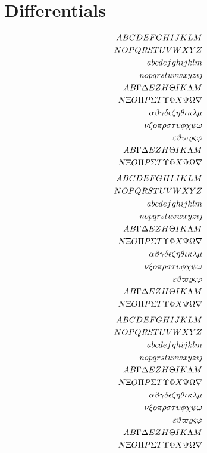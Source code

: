 \documentclass[fleqn]{article}
\def\test#1{#1}
\def\testupperi{%
  \test A \test B \test C \test D \test E \test F \test G \test H
  \test I \test J \test K \test L \test M }
\def\testupperii{%
  \test N \test O \test P \test Q \test R \test S \test T \test U
  \test V \test W \test X \test Y \test Z }
\def\testloweri{%
  \test a \test b \test c \test d \test e \test f \test g \test h
  \test i \test j \test k \test l \test m }
\def\testlowerii{%
  \test n \test o \test p \test q \test r \test s \test t \test u
  \test v \test w \test x \test y \test z 
  \test\imath \test\jmath }
\def\testupgreeki{%
  \test A \test B \test\Gamma \test\Delta \test E \test Z \test H
  \test\Theta \test I \test K \test\Lambda \test M }
\def\testupgreekii{%
  \test N \test\Xi \test O \test\Pi \test P \test\Sigma \test T
  \test\Upsilon \test\Phi \test X \test\Psi \test\Omega 
  \test\nabla }
\def\testlowgreeki{%
  \test\alpha \test\beta \test\gamma \test\delta \test\epsilon
  \test\zeta \test\eta \test\theta \test\iota \test\kappa \test\lambda
  \test\mu }
\def\testlowgreekii{%
  \test\nu \test\xi \test o \test\pi \test\rho \test\sigma \test\tau
  \test\upsilon \test\phi \test\chi \test\psi \test\omega }
\def\testlowgreekiii{%
  \test\varepsilon \test\vartheta \test\varpi \test\varrho
  \test\varsigma \test\varphi}
\begin{document}
\clearpage
\section{Differentials}

\begin{eqnarray*}
\gdef\test#1{\dit #1+}%
  && {\testupperi}\\
  && {\testupperii}\\
  && {\testloweri}\\ 
  && {\testlowerii}\\ 
  && {\testupgreeki}\\
  && {\testupgreekii}\\
  && {\testlowgreeki}\\
  && {\testlowgreekii}\\
  && {\testlowgreekiii}\\
\gdef\test#1{\dit \mathrm{#1}+}%
  && {\testupgreeki}\\
  && {\testupgreekii}
\end{eqnarray*}%
%
\begin{eqnarray*}
\gdef\test#1{\dup #1+}%
  && {\testupperi}\\
  && {\testupperii}\\
  && {\testloweri}\\ 
  && {\testlowerii}\\ 
  && {\testupgreeki}\\
  && {\testupgreekii}\\
  && {\testlowgreeki}\\
  && {\testlowgreekii}\\
  && {\testlowgreekiii}\\
\gdef\test#1{\dup \mathrm{#1}+}%
  && {\testupgreeki}\\
  && {\testupgreekii}
\end{eqnarray*}%
%
\begin{eqnarray*}
\gdef\test#1{\partial #1+}%
  && {\testupperi}\\
  && {\testupperii}\\
  && {\testloweri}\\ 
  && {\testlowerii}\\ 
  && {\testupgreeki}\\
  && {\testupgreekii}\\
  && {\testlowgreeki}\\
  && {\testlowgreekii}\\
  && {\testlowgreekiii}\\
\gdef\test#1{\partial \mathrm{#1}+}%
  && {\testupgreeki}\\
  && {\testupgreekii}
\end{eqnarray*}%
\end{document}
